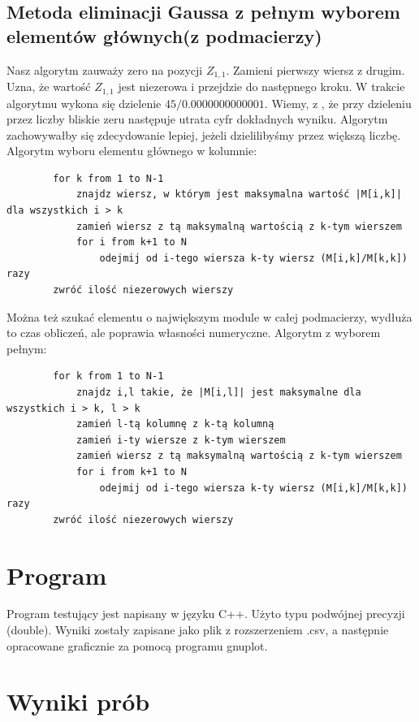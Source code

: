 \documentclass[a4paper,10pt]{article}
\begin{document}
    \subsection{Metoda eliminacji Gaussa z pełnym wyborem elementów głównych(z podmacierzy)}%
		Nasz algorytm zauważy zero na pozycji $Z_{1,1}$. Zamieni pierwszy wiersz z drugim. Uzna, że wartość $Z_{1,1}$ jest niezerowa i przejdzie
	do następnego kroku. W trakcie algorytmu wykona się dzielenie $45/0.0000000000001$. Wiemy, z \cite{SL}, że przy dzieleniu przez liczby bliskie zeru
	następuje utrata cyfr dokładnych wyniku. Algorytm zachowywałby się zdecydowanie lepiej, jeżeli dzielilibyśmy przez większą liczbę.
		Algorytm wyboru elementu głównego w kolumnie:
	\begin{verbatim}
		for k from 1 to N-1
		    znajdz wiersz, w którym jest maksymalna wartość |M[i,k]| dla wszystkich i > k
		    zamień wiersz z tą maksymalną wartością z k-tym wierszem
		    for i from k+1 to N
		        odejmij od i-tego wiersza k-ty wiersz (M[i,k]/M[k,k]) razy
		zwróć ilość niezerowych wierszy
	\end{verbatim}
	Można też szukać elementu o największym module w całej podmacierzy,
	wydłuża to czas obliczeń, ale poprawia własności numeryczne.
		Algorytm z wyborem pełnym:
	\begin{verbatim}
		for k from 1 to N-1
		    znajdz i,l takie, że |M[i,l]| jest maksymalne dla wszystkich i > k, l > k
		    zamień l-tą kolumnę z k-tą kolumną
		    zamień i-ty wiersze z k-tym wierszem
		    zamień wiersz z tą maksymalną wartością z k-tym wierszem
		    for i from k+1 to N
		        odejmij od i-tego wiersza k-ty wiersz (M[i,k]/M[k,k]) razy
		zwróć ilość niezerowych wierszy
	\end{verbatim}
\section{Program}
	Program testujący jest napisany w języku C++. Użyto typu podwójnej precyzji (double). Wyniki zostały zapisane jako plik z rozszerzeniem .csv, a następnie opracowane graficznie za pomocą programu gnuplot.
	
\section{Wyniki prób}
\end{document}
